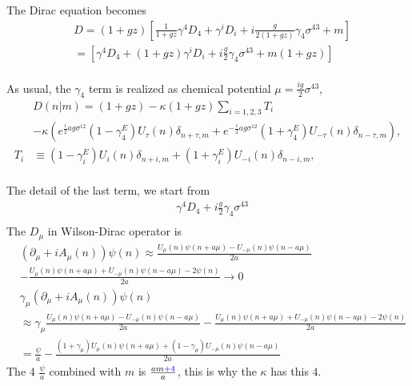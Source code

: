 The Dirac equation becomes
\begin{equation}
\begin{split}
&D=(1+gz)\left[\frac{1}{1+gz}\gamma ^4D_4+\gamma ^iD_i+i\frac{g}{2(1+gz)}\gamma _4 \sigma ^{43}+m\right]\\
&=\left[\gamma ^4D_4+(1+gz)\gamma ^iD_i+i\frac{g}{2}\gamma _4 \sigma ^{43}+m(1+gz)\right]\\
\end{split}
\end{equation}

As usual, the $\gamma _4$ term is realized as chemical potential $\mu = \frac{ig}{2}\sigma ^{43}$,
\begin{equation}
\begin{split}
&D(n|m)=(1+gz)-\kappa (1+gz)\sum _{i = 1,2,3} T_i \\
&-\kappa \left(e^{\frac{i}{2}ag \sigma ^{12} } (1-\gamma^E _4) U_{\tau}(n)\delta _{n+\tau, m} + e^{-\frac{i}{2}ag \sigma ^{12} } (1+\gamma^E _4) U_{-\tau}(n)\delta _{n-\tau, m}\right),\\
T_{i}&\equiv (1-\gamma _i^E)U_{i}(n)\delta _{n+i,m}+(1+\gamma _i^E)U_{-i}(n)\delta _{n-i,m},\\
\end{split}
\end{equation}

The detail of the last term, we start from
\begin{equation}
\begin{split}
&\gamma ^4D_4+i\frac{g}{2}\gamma _4 \sigma ^{43}\\
\end{split}
\end{equation}
The $D_{\mu}$ in Wilson-Dirac operator is
\begin{equation}
\begin{split}
&\left(\partial _{\mu} + iA_{\mu}(n)\right)\psi(n)\approx  \frac{U_{\mu}(n)\psi(n+a\mu)-U_{-\mu}(n)\psi(n-a\mu)}{2a}\\
& -\frac{U_{\mu}(n)\psi(n+a\mu)+U_{-\mu}(n)\psi(n-a\mu)-2\psi (n)}{2a} \to 0 \\
& \gamma _{\mu}  \left(\partial _{\mu} + iA_{\mu}(n)\right)\psi(n) \\
&\approx \gamma _{\mu}  \frac{U_{\mu}(n)\psi(n+a\mu)-U_{-\mu}(n)\psi(n-a\mu)}{2a} -\frac{U_{\mu}(n)\psi(n+a\mu)+U_{-\mu}(n)\psi(n-a\mu)-2\psi (n)}{2a}\\
&=\frac{\psi}{a} -   \frac{(1+\gamma _{\mu})U_{\mu}(n)\psi(n+a\mu)+(1-\gamma _{\mu})U_{-\mu}(n)\psi(n-a\mu)}{2a}
\end{split}
\end{equation}
The $4$ $\frac{\psi}{a}$ combined with $m$ is $\frac{am\textcolor[rgb]{0,0,1}{+4}}{a}$, this is why the $\kappa$ has this $4$.

